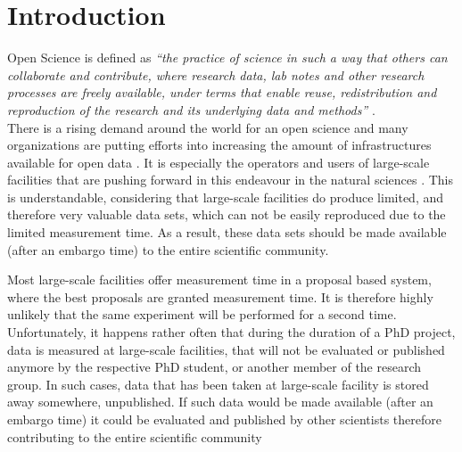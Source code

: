 \documentclass[aps,prx,reprint,amsmath,amssymb,superscriptaddress,showpacs]{revtex4-1}
\begin{document}
\maketitle



\section{Introduction}

Open Science is defined as \emph{``the practice of science in such a way that others can collaborate and contribute, where research data, lab notes and other research processes are freely available, under terms that enable reuse, redistribution and reproduction of the research and its underlying data and methods''} \cite{foster}.\\

There is a rising demand around the world for an open science and many organizations are putting efforts into increasing the amount of infrastructures available for open data \cite{plos, sharing, panosc, nfdi, expands}. 
It is especially the operators and users of large-scale facilities that are pushing forward in this endeavour in the natural sciences \cite{panosc, nfdi, expands}.
This is understandable, considering that large-scale facilities do produce limited, and therefore very valuable data sets, which can not be easily reproduced due to the limited measurement time. As a result, these data sets should be made available (after an embargo time) to the entire scientific community. 

Most large-scale facilities offer measurement time in a proposal based system, where the best proposals are granted measurement time.
It is therefore highly unlikely that the same experiment will be performed for a second time. 
Unfortunately, it happens rather often that during the duration of a PhD project, data is measured at large-scale facilities, that will not be evaluated or published anymore by the respective PhD student, or another member of the research group.
In such cases, data that has been taken at large-scale facility is stored away somewhere, unpublished.
If such data would be made available (after an embargo time) it could be evaluated and published by other scientists therefore contributing to the entire scientific community
\end{document}
